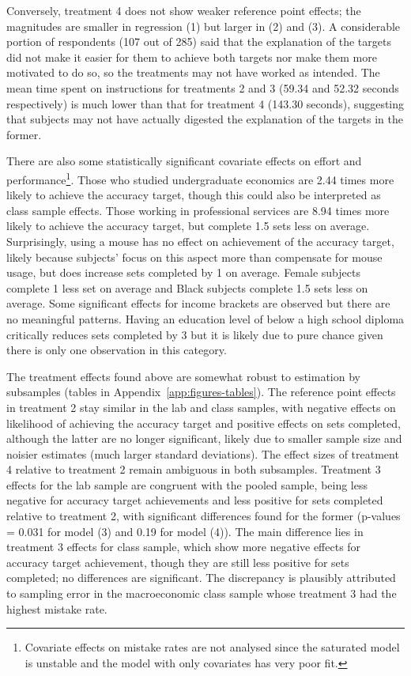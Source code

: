 \documentclass[12pt, letterpaper]{article}
\begin{document}
Conversely, treatment 4 does not show weaker reference point effects; the magnitudes are smaller in regression (1) but larger in (2) and (3). A considerable portion of respondents (107 out of 285) said that the explanation of the targets did not make it easier for them to achieve both targets nor make them more motivated to do so, so the treatments may not have worked as intended. The mean time spent on instructions for treatments 2 and 3 (59.34 and 52.32 seconds respectively) is much lower than that for treatment 4 (143.30 seconds), suggesting that subjects may not have actually digested the explanation of the targets in the former.

There are also some statistically significant covariate effects on effort and performance\footnote{Covariate effects on mistake rates are not analysed since the saturated model is unstable and the model with only covariates has very poor fit.}. Those who studied undergraduate economics are 2.44 times more likely to achieve the accuracy target, though this could also be interpreted as class sample effects. Those working in professional services are 8.94 times more likely to achieve the accuracy target, but complete 1.5 sets less on average. Surprisingly, using a mouse has no effect on achievement of the accuracy target, likely because subjects' focus on this aspect more than compensate for mouse usage, but does increase sets completed by 1 on average. Female subjects complete 1 less set on average and Black subjects complete 1.5 sets less on average. Some significant effects for income brackets are observed but there are no meaningful patterns. Having an education level of below a high school diploma critically reduces sets completed by 3 but it is likely due to pure chance given there is only one observation in this category.

The treatment effects found above are somewhat robust to estimation by subsamples (tables in Appendix~\ref{app:figures-tables}). The reference point effects in treatment 2 stay similar in the lab and class samples, with negative effects on likelihood of achieving the accuracy target and positive effects on sets completed, although the latter are no longer significant, likely due to smaller sample size and noisier estimates (much larger standard deviations). The effect sizes of treatment 4 relative to treatment 2 remain ambiguous in both subsamples. Treatment 3 effects for the lab sample are congruent with the pooled sample, being less negative for accuracy target achievements and less positive for sets completed relative to treatment 2, with significant differences found for the former (p-values = 0.031 for model (3) and 0.19 for model (4)). The main difference lies in treatment 3 effects for class sample, which show more negative effects for accuracy target achievement, though they are still less positive for sets completed; no differences are significant. The discrepancy is plausibly attributed to sampling error in the macroeconomic class sample whose treatment 3 had the highest mistake rate.
\end{document}
